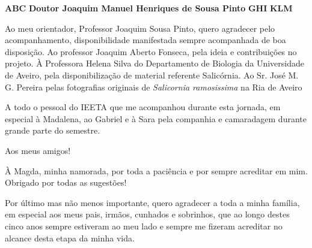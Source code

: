 \documentclass[11pt,twoside,a4paper]{report}
\begin{document}
\TitlePage
  \vspace*{55mm}
       {}
       {\textbf{ABC}}
  \vspace*{5mm}
       {\textbf{Doutor Joaquim Manuel Henriques de Sousa Pinto}}
  \vspace*{5mm}
  \TEXT{}
       {\textbf{GHI}}
  \vspace*{5mm}
  \TEXT{}
       {\textbf{KLM}}
\EndTitlePage
\titlepage\ \endtitlepage %

\TitlePage
  \vspace*{55mm}
{Ao meu orientador, Professor Joaquim Sousa Pinto, quero agradecer pelo acompanhamento, disponibilidade manifestada sempre acompanhada de boa disposição. Ao professor Joaquim Aberto Fonseca, pela ideia e contribuições no projeto. À Professora Helena Silva do Departamento de Biologia da Universidade de Aveiro, pela disponibilização de material referente Salicórnia. Ao Sr. José M. G. Pereira pelas fotografias originais de \textit{Salicornia ramosissima} na Ria de Aveiro} 

\TEXT{}
{A todo o pessoal do IEETA que me acompanhou durante esta jornada, em especial à Madalena, ao Gabriel e à Sara pela companhia e camaradagem durante grande parte do semestre.}

\TEXT{}
{Aos meus amigos!}   

\TEXT{}
{À Magda, minha namorada, por toda a paciência e por sempre acreditar em mim. Obrigado por todas as sugestões!}




 

	
\TEXT{}
{Por último mas não menos importante, quero agradecer a toda a minha família, em especial aos meus pais, irmãos, cunhados e sobrinhos, que ao longo destes cinco anos sempre estiveram ao meu lado e sempre me fizeram acreditar no alcance desta etapa da minha vida. }
     
\end{document}
